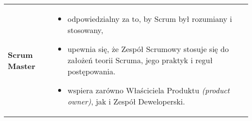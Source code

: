 \documentclass[../main.tex]{subfiles}
\begin{document}
\begin{table}[H]
\begin{center}
\begin{tabular}{ p{} p{} }
                \cmidrule(r){1-1}\cmidrule(l){2-2}
                \textbf{Scrum Master}
                &
                \begin{itemize}
                    \item odpowiedzialny za to, by Scrum był rozumiany i stosowany,
                    \item upewnia się, że Zespół Scrumowy stosuje się do założeń teorii Scruma, jego praktyk i reguł postępowania.
                    \item wspiera zarówno Właściciela Produktu \textit{(product owner)}, jak i Zespół Deweloperski.
                \end{itemize}
                \\
            \end{tabular}
        \end{center}
    \end{table}
\end{document}
